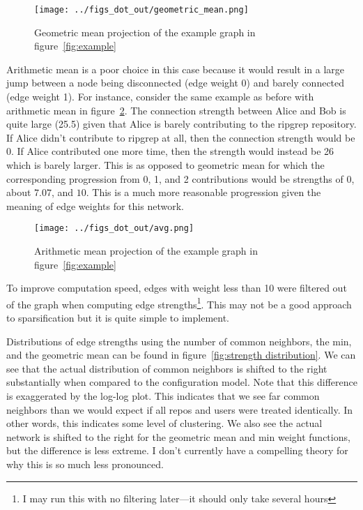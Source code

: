 \documentclass{pset}
\begin{document}
\begin{figure}[ht]
\centering
\texttt{[image: ../figs\_dot\_out/geometric\_mean.png]}
\caption{Geometric mean projection of the example graph in figure~\ref{fig:example}}\label{fig:geometric}
\end{figure}



Arithmetic mean is a poor choice in this case because it would result in a
large jump between
a node being disconnected (edge weight 0) and barely connected (edge weight 1).
For instance, consider the same example as before with arithmetic mean
in figure~\ref{fig:mean}. The connection strength between Alice and Bob is quite
large (25.5) given that Alice is barely contributing to the ripgrep repository.
If Alice didn't contribute to ripgrep at all, then the connection strength would
be 0. If Alice contributed one more time, then the strength would instead be 26
which is barely larger. This is as opposed to geometric mean
for which the corresponding progression from 0, 1, and 2 contributions would be
strengths of 0, about $7.07$, and $10$. This is a much more reasonable progression
given the meaning of edge weights for this network.

\begin{figure}[ht]
\centering
\texttt{[image: ../figs\_dot\_out/avg.png]}
\caption{Arithmetic mean projection of the example graph in figure~\ref{fig:example}}\label{fig:mean}
\end{figure}

To improve computation speed, edges
with weight less than 10 were filtered out of the graph
when computing edge strengths\footnote{I may run this
with no filtering later---it should only take several hours}. This may not be
a good approach to sparsification but it is quite simple to implement.

Distributions of edge strengths using the number of
common neighbors, the min, and the geometric mean can be found in
figure~\ref{fig:strength distribution}.  
We can see that
the actual distribution of common neighbors is shifted to the right
substantially when compared to the configuration model. Note that this
difference is exaggerated by the log-log plot. This indicates that we see far
common neighbors than we would expect if all repos and users were treated
identically. In other words, this indicates some level of clustering.  We also
see the actual network is shifted to the right for the geometric mean and min
weight functions, but the difference is less extreme.  I don't currently have a
compelling theory for why this is so much less pronounced. 
\end{document}
